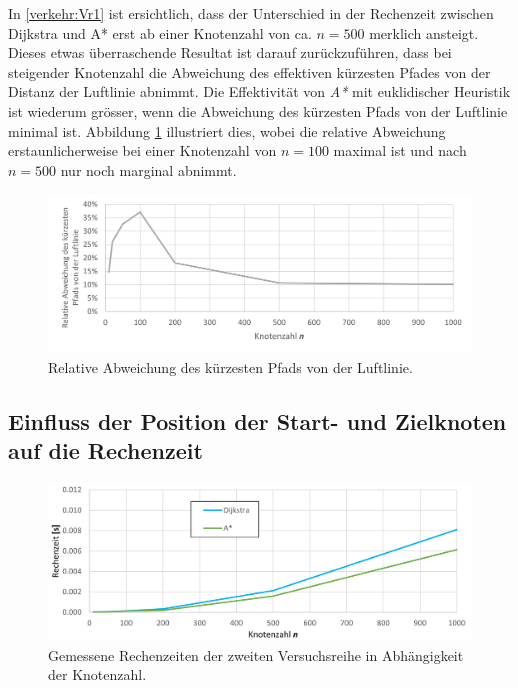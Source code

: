 In \ref{verkehr:Vr1} ist ersichtlich, dass der Unterschied in der Rechenzeit zwischen Dijkstra und A* erst ab einer Knotenzahl von ca. $n=500$ merklich ansteigt. Dieses etwas überraschende Resultat ist darauf zurückzuführen, dass bei steigender Knotenzahl die Abweichung des effektiven kürzesten Pfades von der Distanz der Luftlinie abnimmt.
Die Effektivität von \emph{A*} mit euklidischer Heuristik ist wiederum grösser, wenn die Abweichung des kürzesten Pfads von der Luftlinie minimal ist.
Abbildung \ref{verkehr:pathDifference} illustriert dies, wobei die relative Abweichung erstaunlicherweise bei einer Knotenzahl von $n=100$ maximal ist und nach $n=500$ nur noch marginal abnimmt.

\begin{figure}
\centering
\includegraphics[width=12cm]{papers/verkehr/figures/chart_pathDiff.png}

\caption{Relative Abweichung des kürzesten Pfads von der Luftlinie.}
\label{verkehr:pathDifference}
\end{figure}


\subsection{Einfluss der Position der Start- und Zielknoten auf die Rechenzeit}

\begin{figure}
\centering
\includegraphics[width=12cm]{papers/verkehr/figures/chart_Vr2.png}
\caption{Gemessene Rechenzeiten der zweiten Versuchsreihe in Abhängigkeit der Knotenzahl.}
\label{verkehr:Vr2}
\end{figure}

